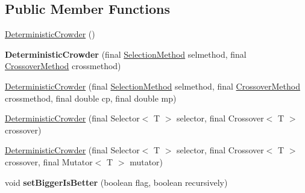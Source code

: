 \subsection*{Public Member Functions}
\begin{CompactItemize}
\item 
\hyperlink{classjenes_1_1stage_1_1operator_1_1common_1_1_deterministic_crowder_3_01_t_01extends_01_chromosome_01_4_d52c0d6a4bc032c8c198bf05cc3acf6f}{DeterministicCrowder} ()
\item 
\hypertarget{classjenes_1_1stage_1_1operator_1_1common_1_1_deterministic_crowder_3_01_t_01extends_01_chromosome_01_4_e974a4b359a9a467dfa434dd47a27cf7}{
\textbf{DeterministicCrowder} (final \hyperlink{classjenes_1_1stage_1_1operator_1_1common_1_1_deterministic_crowder_3_01_t_01extends_01_chromosome_01_4_f734ac23216aafb25e63014b0b676e67}{SelectionMethod} selmethod, final \hyperlink{classjenes_1_1stage_1_1operator_1_1common_1_1_deterministic_crowder_3_01_t_01extends_01_chromosome_01_4_e58e16af4a8087c42225aa099718231d}{CrossoverMethod} crossmethod)}
\label{classjenes_1_1stage_1_1operator_1_1common_1_1_deterministic_crowder_3_01_t_01extends_01_chromosome_01_4_e974a4b359a9a467dfa434dd47a27cf7}

\item 
\hyperlink{classjenes_1_1stage_1_1operator_1_1common_1_1_deterministic_crowder_3_01_t_01extends_01_chromosome_01_4_a59e2a1dcdb2cd6cc7a70e344a77dd31}{DeterministicCrowder} (final \hyperlink{classjenes_1_1stage_1_1operator_1_1common_1_1_deterministic_crowder_3_01_t_01extends_01_chromosome_01_4_f734ac23216aafb25e63014b0b676e67}{SelectionMethod} selmethod, final \hyperlink{classjenes_1_1stage_1_1operator_1_1common_1_1_deterministic_crowder_3_01_t_01extends_01_chromosome_01_4_e58e16af4a8087c42225aa099718231d}{CrossoverMethod} crossmethod, final double cp, final double mp)
\item 
\hyperlink{classjenes_1_1stage_1_1operator_1_1common_1_1_deterministic_crowder_3_01_t_01extends_01_chromosome_01_4_d7eed64a7fe60239ba3289ebf6003e8c}{DeterministicCrowder} (final Selector$<$ T $>$ selector, final Crossover$<$ T $>$ crossover)
\item 
\hyperlink{classjenes_1_1stage_1_1operator_1_1common_1_1_deterministic_crowder_3_01_t_01extends_01_chromosome_01_4_6359043178a5e4d8922485528acbbcec}{DeterministicCrowder} (final Selector$<$ T $>$ selector, final Crossover$<$ T $>$ crossover, final Mutator$<$ T $>$ mutator)
\item 
\hypertarget{classjenes_1_1stage_1_1operator_1_1common_1_1_deterministic_crowder_3_01_t_01extends_01_chromosome_01_4_f7b258f528b701713808c16bca29ca66}{
void \textbf{setBiggerIsBetter} (boolean flag, boolean recursively)}
\label{classjenes_1_1stage_1_1operator_1_1common_1_1_deterministic_crowder_3_01_t_01extends_01_chromosome_01_4_f7b258f528b701713808c16bca29ca66}

\end{CompactItemize}
